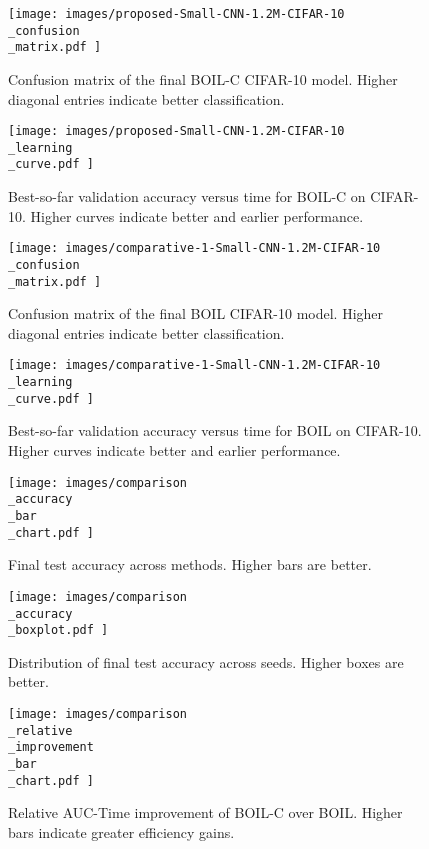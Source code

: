 \documentclass{article} %
\begin{document}
\begin{figure}[H]
\centering
\texttt{[image:  images/proposed-Small-CNN-1.2M-CIFAR-10\\\_confusion\\\_matrix.pdf ]}
\caption{Confusion matrix of the final BOIL-C CIFAR-10 model. Higher diagonal entries indicate better classification.}
\end{figure}

\begin{figure}[H]
\centering
\texttt{[image:  images/proposed-Small-CNN-1.2M-CIFAR-10\\\_learning\\\_curve.pdf ]}
\caption{Best-so-far validation accuracy versus time for BOIL-C on CIFAR-10. Higher curves indicate better and earlier performance.}
\end{figure}

\begin{figure}[H]
\centering
\texttt{[image:  images/comparative-1-Small-CNN-1.2M-CIFAR-10\\\_confusion\\\_matrix.pdf ]}
\caption{Confusion matrix of the final BOIL CIFAR-10 model. Higher diagonal entries indicate better classification.}
\end{figure}

\begin{figure}[H]
\centering
\texttt{[image:  images/comparative-1-Small-CNN-1.2M-CIFAR-10\\\_learning\\\_curve.pdf ]}
\caption{Best-so-far validation accuracy versus time for BOIL on CIFAR-10. Higher curves indicate better and earlier performance.}
\end{figure}

\begin{figure}[H]
\centering
\texttt{[image:  images/comparison\\\_accuracy\\\_bar\\\_chart.pdf ]}
\caption{Final test accuracy across methods. Higher bars are better.}
\end{figure}

\begin{figure}[H]
\centering
\texttt{[image:  images/comparison\\\_accuracy\\\_boxplot.pdf ]}
\caption{Distribution of final test accuracy across seeds. Higher boxes are better.}
\end{figure}

\begin{figure}[H]
\centering
\texttt{[image:  images/comparison\\\_relative\\\_improvement\\\_bar\\\_chart.pdf ]}
\caption{Relative AUC-Time improvement of BOIL-C over BOIL. Higher bars indicate greater efficiency gains.}
\end{figure}
\end{document}
